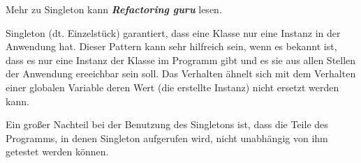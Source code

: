Mehr zu Singleton kann \textit{\textbf{Refactoring guru}} lesen.

Singleton (dt. Einzelstück) garantiert, dass eine Klasse nur eine Instanz in der Anwendung hat.
Dieser Pattern kann sehr hilfreich sein, wenn es bekannt ist, dass es nur eine Instanz der Klasse im Programm gibt 
und es sie aus allen Stellen der Anwendung ereeichbar sein soll.
Das Verhalten ähnelt sich mit dem Verhalten einer 
globalen Variable deren Wert (die erstellte Instanz) nicht ersetzt werden kann.

Ein großer Nachteil bei der Benutzung des Singletons ist, 
dass die Teile des Programms, in denen Singleton aufgerufen wird, nicht unabhängig von ihm getestet werden können.
